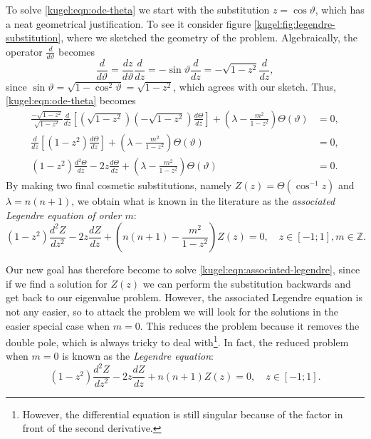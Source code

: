 To solve \eqref{kugel:eqn:ode-theta} we start with the substitution $z = \cos
\vartheta$, which has a neat geometrical justification. To see it consider
figure \ref{kugel:fig:legendre-substitution}, where we sketched the geometry of
the problem. Algebraically, the operator $\frac{d}{d \vartheta}$ becomes
\begin{equation*}
    \frac{d}{d \vartheta}
    = \frac{dz}{d \vartheta}\frac{d}{dz}
    = -\sin \vartheta \frac{d}{dz}
    = -\sqrt{1-z^2} \frac{d}{dz},
\end{equation*} 
since $\sin \vartheta = \sqrt{1 - \cos^2 \vartheta} = \sqrt{1 - z^2}$, which
agrees with our sketch. Thus, \eqref{kugel:eqn:ode-theta} becomes 
\begin{align*}
  \frac{-\sqrt{1-z^2}}{\sqrt{1-z^2}} \frac{d}{dz} \left[
    \left(\sqrt{1-z^2}\right) \left(-\sqrt{1-z^2}\right) \frac{d \Theta}{dz}
  \right]
  + \left( \lambda - \frac{m^2}{1 - z^2} \right)\Theta(\vartheta) &= 0,
  \\
  \frac{d}{dz} \left[ (1-z^2) \frac{d \Theta}{dz} \right]
  + \left( \lambda - \frac{m^2}{1 - z^2} \right)\Theta(\vartheta) &= 0,
  \\
  (1-z^2)\frac{d^2 \Theta}{dz} - 2z\frac{d \Theta}{dz}
  + \left( \lambda - \frac{m^2}{1 - z^2} \right)\Theta(\vartheta) &= 0.
\end{align*}
By making two final cosmetic substitutions, namely $Z(z) = \Theta(\cos^{-1}z)$
and $\lambda = n(n+1)$, we obtain what is known in the literature as the
\emph{associated Legendre equation of order $m$}:
\nocite{olver_introduction_2013}
\begin{equation} \label{kugel:eqn:associated-legendre}
  (1 - z^2)\frac{d^2 Z}{dz^2}
  - 2z\frac{d Z}{dz}
  + \left( n(n + 1) - \frac{m^2}{1 - z^2} \right) Z(z) = 0,
  \quad
  z \in [-1; 1], m \in \mathbb{Z}.
\end{equation}

Our new goal has therefore become to solve
\eqref{kugel:eqn:associated-legendre}, since if we find a solution for $Z(z)$ we
can perform the substitution backwards and get back to our eigenvalue problem.
However, the associated Legendre equation is not any easier, so to attack the
problem we will look for the solutions in the easier special case when $m = 0$.
This reduces the problem because it removes the double pole, which is always
tricky to deal with\footnote{However, the differential equation is still
singular because of the factor in front of the second derivative.}. In fact, the
reduced problem when $m = 0$ is known as the \emph{Legendre equation}:
\begin{equation} \label{kugel:eqn:legendre}
  (1 - z^2)\frac{d^2 Z}{dz^2}
  - 2z\frac{d Z}{dz}
  + n(n + 1) Z(z) = 0,
  \quad
  z \in [-1; 1].
\end{equation}

